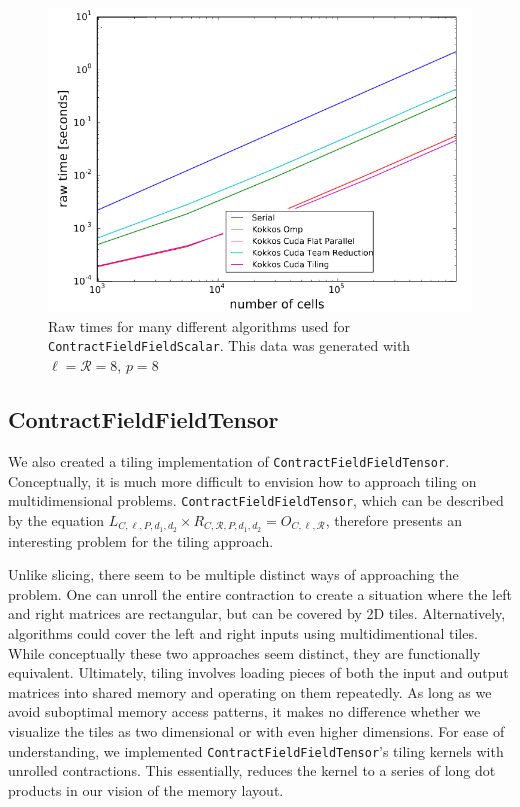 \begin{figure}[H]
    \centering
    \includegraphics[width=5in]{CFFS_RawTimes_LRP8_2.PNG}
    \caption[\texttt{ContractFieldFieldScalar} performance summary (small)]{Raw
        times for many different algorithms used for \texttt{ContractFieldFieldScalar}.
        This data was generated with $\ell=\mathcal{R}=8$, $p=8$}
\label{fig:TilingPerformance2}
\end{figure}

\subsection{ContractFieldFieldTensor}

We also created a tiling implementation of \texttt{ContractFieldFieldTensor}. Conceptually, it is much more difficult to envision how to approach tiling on multidimensional problems. \texttt{ContractFieldFieldTensor}, which can be described by the equation $L_{C,\ell,P,d_1,d_2} \times R_{C, \mathcal{R}, P,d_1,d_2} = O_{C,\ell, \mathcal{R}}$, therefore presents an interesting problem for the tiling approach. 

Unlike slicing, there seem to be multiple distinct ways of approaching the
problem. One can unroll the entire contraction to create a situation where
the left and right matrices are rectangular, but can be covered by 2D tiles.
Alternatively, algorithms could cover the left and right inputs using
multidimentional tiles. While conceptually these two approaches seem distinct,
they are functionally equivalent. Ultimately, tiling involves loading pieces of
both the input and output matrices into shared memory and operating on them
repeatedly. As long as we avoid suboptimal memory access patterns, it makes no
difference whether we visualize the tiles as two dimensional or with even higher
dimensions. For ease of understanding, we implemented
\texttt{ContractFieldFieldTensor}'s tiling kernels with unrolled
contractions. This essentially, reduces the kernel to a series of long dot
products in our vision of the memory layout. 

